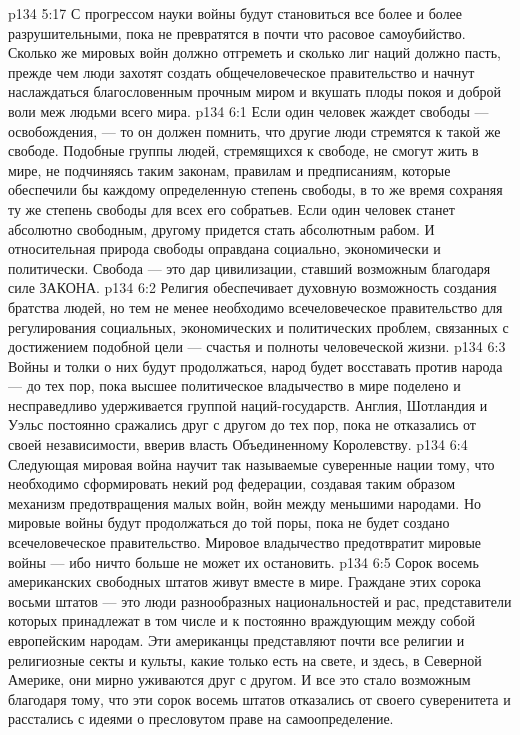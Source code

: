 \vs p134 5:17 С прогрессом науки войны будут становиться все более и более разрушительными, пока не превратятся в почти что расовое самоубийство. Сколько же мировых войн должно отгреметь и сколько лиг наций должно пасть, прежде чем люди захотят создать общечеловеческое правительство и начнут наслаждаться благословенным прочным миром и вкушать плоды покоя и доброй воли меж людьми всего мира.
\vs p134 6:1 Если один человек жаждет свободы --- освобождения, --- то он должен помнить, что  другие люди стремятся к такой же свободе. Подобные группы людей, стремящихся к свободе, не смогут жить в мире, не подчиняясь таким законам, правилам и предписаниям, которые обеспечили бы каждому определенную степень свободы, в то же время сохраняя ту же степень свободы для всех его собратьев. Если один человек станет абсолютно свободным, другому придется стать абсолютным рабом. И относительная природа свободы оправдана социально, экономически и политически. Свобода --- это дар цивилизации, ставший возможным благодаря силе ЗАКОНА.
\vs p134 6:2 Религия обеспечивает духовную возможность создания братства людей, но тем не менее необходимо всечеловеческое правительство для регулирования социальных, экономических и политических проблем, связанных с достижением подобной цели --- счастья и полноты человеческой жизни.
\vs p134 6:3 Войны и толки о них будут продолжаться, народ будет восставать против народа --- до тех пор, пока высшее политическое владычество в мире поделено и несправедливо удерживается группой наций\hyp{}государств. Англия, Шотландия и Уэльс постоянно сражались друг с другом до тех пор, пока не отказались от своей независимости, вверив власть Объединенному Королевству.
\vs p134 6:4 Следующая мировая война научит так называемые суверенные нации тому, что необходимо сформировать некий род федерации, создавая таким образом механизм предотвращения малых войн, войн между меньшими народами. Но мировые войны будут продолжаться до той поры, пока не будет создано всечеловеческое правительство. Мировое владычество предотвратит мировые войны --- ибо ничто больше не может их остановить.
\vs p134 6:5 Сорок восемь американских свободных штатов живут вместе в мире. Граждане этих сорока восьми штатов --- это люди разнообразных национальностей и рас, представители которых принадлежат в том числе и к постоянно враждующим между собой европейским народам. Эти американцы представляют почти все религии и религиозные секты и культы, какие только есть на свете, и здесь, в Северной Америке, они мирно уживаются друг с другом. И все это стало возможным благодаря тому, что эти сорок восемь штатов отказались от своего суверенитета и расстались с идеями о пресловутом праве на самоопределение.
